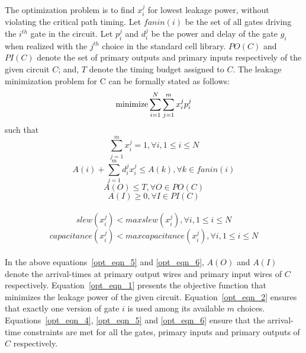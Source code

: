  
 
%
\noindent The optimization problem is to find $x_{i}^{j}$ for lowest leakage power, without violating the critical path timing. Let $fanin(i)$ be the set of all gates driving the $i^{th}$ gate in the circuit. Let $p_{i}^{j}$ and $d_{i}^{j}$ be the power and delay of the gate $g_{i}$ when realized with the $j^{th}$ choice in the standard cell library. $PO(C)$ and $PI(C)$ denote the set of  primary outputs and  primary inputs respectively of the given circuit $C$; and, $T$ denote the timing budget assigned to $C$. The leakage minimization problem for C can be formally stated as follows:
\begin{equation}\label{opt_eqn_1} {\Large{\underset{}{\operatorname{minimize}}\sum_{i=1}^{N} \sum_{j=1}^{m} x_{i}^{j} p_{i}^{j}}}  \end{equation}
\indent \indent \indent \indent \indent such that
\begin{equation}\label{opt_eqn_2} \sum_{j=1}^{m} x_{i}^{j} = 1, \forall i, 1 \leq i \leq N\end{equation}
    \begin{equation}\label{opt_eqn_4} A(i) + \sum_{j=1}^{m} d_{i}^{j} x_{i}^{j} \le A(k), \forall k \in fanin(i)\end{equation}
\begin{equation}\label{opt_eqn_5} A(O) \le T, \forall O \in PO(C) \end{equation}
\begin{equation}\label{opt_eqn_6} A(I) \ge 0, \forall I \in PI(C)\end{equation}\\
\begin{equation} \label{opt_eqn_7} slew(x_{i}^{j}) < max slew(x_{i}^{j}), \forall i,1 \leq i \leq N  \end{equation}
\begin{equation} \label{opt_eqn_8} capacitance(x_{i}^{j})<max capacitance(x_{i}^{j}),  \forall i,1 \leq i \leq N \end{equation} \\

\noindent In the above equations~\ref{opt_eqn_5} and \ref{opt_eqn_6}, $A(O)$ and $A(I)$ denote the arrival-times at primary output wires and primary input wires of $C$ respectively. Equation~\ref{opt_eqn_1} presents the objective function that minimizes the leakage power of the given circuit.
Equation~\ref{opt_eqn_2} ensures that exactly one version of gate $i$ is used among its available $m$ choices.
Equations~\ref{opt_eqn_4}, \ref{opt_eqn_5} and \ref{opt_eqn_6} ensure that the arrival-time constraints are met for all the gates, primary inputs and primary outputs of $C$ respectively.

